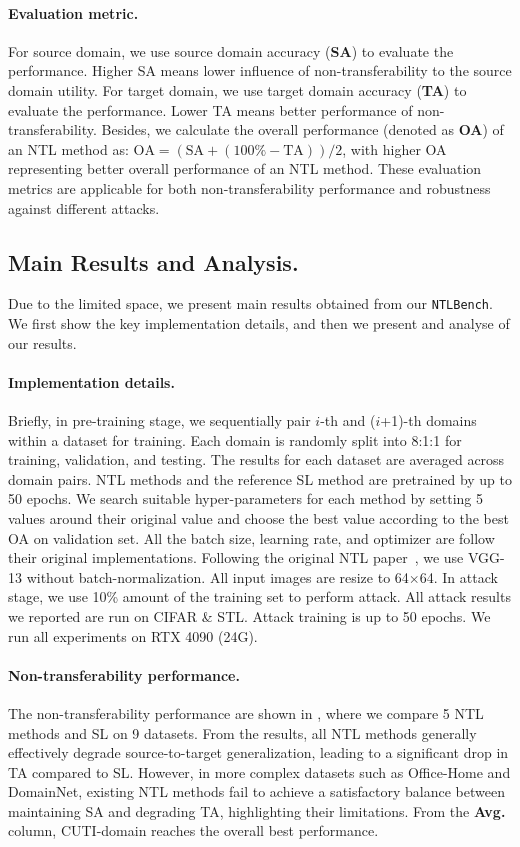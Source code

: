 \paragraph{Evaluation metric.} For source domain, we use source domain accuracy (\textbf{SA}) to evaluate the performance. Higher SA means lower influence of non-transferability to the source domain utility.
For target domain, we use target domain accuracy (\textbf{TA}) to evaluate the performance. Lower TA means better performance of non-transferability.
Besides, we calculate the overall performance (denoted as \textbf{OA}) of an NTL method as: $\text{OA}=(\text{SA}+(100\%-\text{TA}))/2$, with higher OA representing better overall performance of an NTL method. These evaluation metrics are applicable for both non-transferability performance and robustness against different attacks.


\subsection{Main Results and Analysis.}
\label{sec:ntlbenchresults}

Due to the limited space, we present main results obtained from our \texttt{NTLBench}. 
We first show the key implementation details, and then we present and analyse of our results.

\paragraph{Implementation details.}
Briefly, in pre-training stage, we sequentially pair $i$-th and ($i$+1)-th domains within a dataset for training. Each domain is randomly split into 8:1:1 for training, validation, and testing. The results for each dataset are averaged across domain pairs. NTL methods and the reference SL method are pretrained by up to 50 epochs. We search suitable hyper-parameters for each method by setting 5 values around their original value and choose the best value according to the best OA on validation set. All the batch size, learning rate, and optimizer are follow their original implementations. Following the original NTL paper~\cite{wang2021non}, we use VGG-13 without batch-normalization. All input images are resize to 64$\times$64. 
In attack stage, we use 10\% amount of the training set to perform attack. All attack results we reported are run on CIFAR \& STL. Attack training is up to 50 epochs.
We run all experiments on RTX 4090 (24G).


\paragraph{Non-transferability performance.} The non-transferability performance are shown in , where we compare 5 NTL methods and SL on 9 datasets. From the results, all NTL methods generally effectively degrade source-to-target generalization, leading to a significant drop in TA compared to SL. However, in more complex datasets such as Office-Home and DomainNet, existing NTL methods fail to achieve a satisfactory balance between maintaining SA and degrading TA, highlighting their limitations. From the \textbf{Avg.} column, CUTI-domain reaches the overall best performance.

